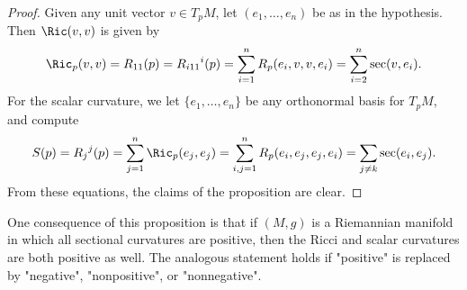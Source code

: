 \begin{proof}
Given any unit vector $v\in T_pM$, let $(e_1,\dots,e_n)$ be as in the hypothesis. Then $\Ric(v,v)$ is given by
\[\Ric_p(v,v)=R_{11}(p)={R_{i11}}^i(p)=\sum_{i=1}^{n}R_p(e_i,v,v,e_i)=\sum_{i=2}^{n}\sec(v,e_i).\]
For the scalar curvature, we let $\{e_1,\dots,e_n\}$ be any orthonormal basis for $T_pM$, and compute
\[S(p)={R_j}^j(p)=\sum_{j=1}^{n}\Ric_p(e_j,e_j)=\sum_{i,j=1}^{n}R_p(e_i,e_j,e_j,e_i)=\sum_{j\neq k}\sec(e_i,e_j).\]
From these equations, the claims of the proposition are clear.
\end{proof}
One consequence of this proposition is that if $(M,g)$ is a Riemannian manifold in which all sectional curvatures are positive, then the Ricci and scalar curvatures are 
both positive as well. The analogous statement holds if "positive" is replaced by "negative", "nonpositive", or "nonnegative".
